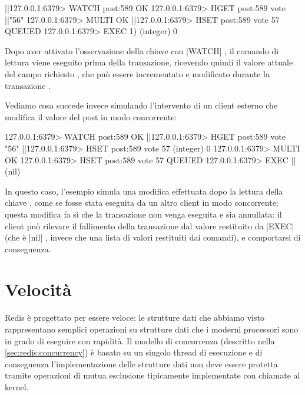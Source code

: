 \begin{commentedsource}[style=redis]
|\lnote|127.0.0.1:6379> WATCH post:589
OK
127.0.0.1:6379> HGET post:589 vote
|\lnote|"56"
127.0.0.1:6379> MULTI
OK
|\lnote|127.0.0.1:6379> HSET post:589 vote 57
QUEUED
127.0.0.1:6379> EXEC
1) (integer) 0
\end{commentedsource}

Dopo aver attivato l'osservazione della chiave con \cverb|WATCH| , il
comando di lettura viene eseguito prima della transazione, ricevendo quindi il valore
attuale del campo richiesto , che può essere incrementato e modificato durante la transazione
.

Vediamo cosa succede invece simulando l'intervento di un client esterno che modifica il valore
del post in modo concorrente:

\begin{commentedsource}[style=redis]
127.0.0.1:6379> WATCH post:589
OK
|\lnote|127.0.0.1:6379> HGET post:589 vote
"56"
|\lnote|127.0.0.1:6379> HSET post:589 vote 57
(integer) 0
127.0.0.1:6379> MULTI
OK
127.0.0.1:6379> HSET post:589 vote 57
QUEUED
127.0.0.1:6379> EXEC
|\lnote|(nil)
\end{commentedsource}

In questo caso, l'esempio simula una modifica  effettuata dopo la lettura della chiave
, come se fosse stata eseguita da un altro client in modo concorrente; questa modifica fa sì
che la transazione non venga eseguita e sia annullata: il client può rilevare il fallimento della
transazione dal valore restituito da \cverb|EXEC| (che è \cverb|nil| , invece che una lista
di valori restituiti dai comandi), e comportarsi di conseguenza.

\section{Velocità}

Redis è progettato per essere veloce: le strutture dati che abbiamo visto rappresentano semplici
operazioni su strutture dati che i moderni processori sono in grado di eseguire con rapidità. Il
modello di concorrenza (descritto nella \autoref{sec:redis:concurrency}) è basato su un singolo
thread di esecuzione e di conseguenza l'implementazione delle strutture dati non deve essere
protetta tramite operazioni di mutua esclusione tipicamente implementate con chiamate al kernel.

